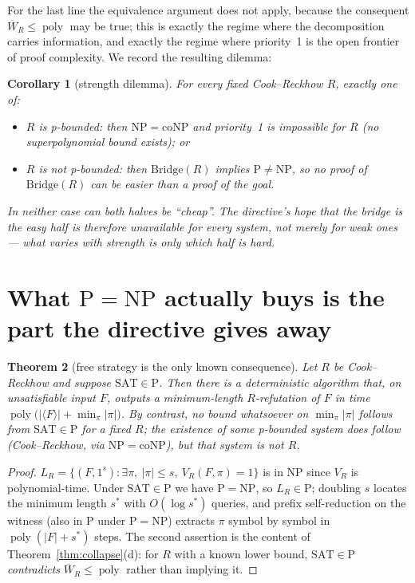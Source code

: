 \documentclass[11pt]{article}
\newtheorem{theorem}{Theorem}
\newtheorem{corollary}[theorem]{Corollary}
\theoremstyle{definition}
\newcommand{\poly}{\operatorname{poly}}
\newcommand{\Wbar}{\overline W}
\begin{document}
For the last line the equivalence argument does not apply, because the
consequent $\Wbar_R\le\poly$ may be true; this is exactly the regime where the
decomposition carries information, and exactly the regime where priority~1 is
the open frontier of proof complexity. We record the resulting dilemma:

\begin{corollary}[strength dilemma]\label{cor:dilemma}
For every fixed Cook--Reckhow $R$, exactly one of:
\begin{itemize}
\item $R$ is p-bounded: then $\mathrm{NP}=\mathrm{coNP}$ and priority~1 is
\emph{impossible} for $R$ (no superpolynomial bound exists); or
\item $R$ is not p-bounded: then $\mathrm{Bridge}(R)$ implies
$\mathrm P\neq\mathrm{NP}$, so no proof of $\mathrm{Bridge}(R)$ can be easier
than a proof of the goal.
\end{itemize}
In neither case can both halves be ``cheap''. The directive's hope that the
bridge is the easy half is therefore unavailable for \emph{every} system, not
merely for weak ones --- what varies with strength is only \emph{which} half is
hard.
\end{corollary}

\section{What $\mathrm P=\mathrm{NP}$ actually buys is the part the
directive gives away}

\begin{theorem}[free strategy is the only known consequence]\label{thm:buys}
Let $R$ be Cook--Reckhow and suppose $\mathrm{SAT}\in\mathrm P$. Then there is
a deterministic algorithm that, on unsatisfiable input $F$, outputs a
\emph{minimum-length} $R$-refutation of $F$ in time
$\poly\bigl(|\langle F\rangle| + \min_{\pi}|\pi|\bigr)$. By contrast, no
bound whatsoever on $\min_\pi|\pi|$ follows from $\mathrm{SAT}\in\mathrm P$ for
a fixed $R$; the existence of \emph{some} p-bounded system does follow
(Cook--Reckhow, via $\mathrm{NP}=\mathrm{coNP}$), but that system is not $R$.
\end{theorem}

\begin{proof}
$L_R=\{(F,1^s):\exists\pi,\ |\pi|\le s,\ V_R(F,\pi)=1\}$ is in NP since $V_R$
is polynomial-time. Under $\mathrm{SAT}\in\mathrm P$ we have
$\mathrm P=\mathrm{NP}$, so $L_R\in\mathrm P$; doubling $s$ locates the
minimum length $s^\ast$ with $O(\log s^\ast)$ queries, and prefix
self-reduction on the witness (also in P under $\mathrm P=\mathrm{NP}$)
extracts $\pi$ symbol by symbol in $\poly(|F|+s^\ast)$ steps. The second
assertion is the content of Theorem~\ref{thm:collapse}(d): for $R$ with a
known lower bound, $\mathrm{SAT}\in\mathrm P$ \emph{contradicts}
$\Wbar_R\le\poly$ rather than implying it.
\end{proof}
\end{document}
